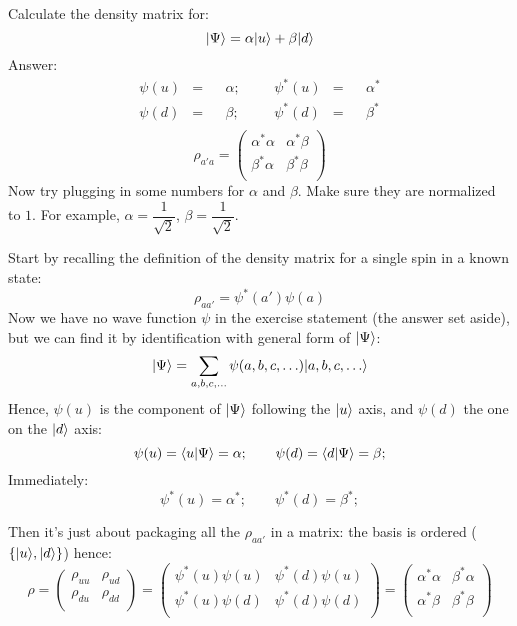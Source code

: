 \documentclass[solutions.tex]{subfiles}
\begin{document}
\maketitle
\begin{exercise} Calculate the density matrix for:
\[
	|\Psi\rangle = \alpha|u\rangle + \beta|d\rangle
\]
Answer:
\begin{equation*}\begin{aligned}
	\psi(u) &=&& \alpha;&&& \psi^*(u) &=&& \alpha^* \\
	\psi(d) &=&& \beta;&&&  \psi^*(d) &=&& \beta^* \\
\end{aligned}\end{equation*}
\[
	\rho_{a'a} = \begin{pmatrix}
		\alpha^*\alpha & \alpha^*\beta \\
		\beta^*\alpha  & \beta^*\beta  \\
	\end{pmatrix}
\]
Now try plugging in some numbers for $\alpha$ and $\beta$. Make
sure they are normalized to $1$. For example, $\alpha=\dfrac1{\sqrt2}$,
$\beta=\dfrac1{\sqrt2}$.
\end{exercise}
Start by recalling the definition of the density matrix for a single spin
in a known state:
\[
	\rho_{aa'} = \psi^*(a')\psi(a)
\]
Now we have no wave function $\psi$ in the exercise statement (the answer
set aside), but we can find it by identification with general form of
$|\Psi\rangle$:
\[
	|\Psi\rangle = \sum_{a,b,c,\ldots}\psi(a,b,c,\ldots)|a,b,c,\ldots\rangle
\]
Hence, $\psi(u)$ is the component of $|\Psi\rangle$ following the $|u\rangle$
axis, and $\psi(d)$ the one on the $|d\rangle$ axis:
\[
	\psi(u) = \left\langle u \middle| \Psi \right\rangle = \alpha;\qquad
	\psi(d) = \left\langle d \middle| \Psi \right\rangle = \beta;
\]
Immediately:
\[
	\psi^*(u) = \alpha^*;\qquad \psi^*(d) = \beta^*;
\]

Then it's just about packaging all the $\rho_{aa'}$ in a matrix: the
basis is ordered ($\{|u\rangle, |d\rangle\}$) hence:
\[
	\rho = \begin{pmatrix}
		\rho_{uu} & \rho_{ud} \\
		\rho_{du} & \rho_{dd} \\
	\end{pmatrix} = \begin{pmatrix}
		\psi^*(u)\psi(u) & \psi^*(d)\psi(u) \\
		\psi^*(u)\psi(d) & \psi^*(d)\psi(d) \\
	\end{pmatrix} = \boxed{\begin{pmatrix}
		\alpha^*\alpha & \beta^*\alpha \\
		\alpha^*\beta  & \beta^*\beta  \\
	\end{pmatrix}}
\]
\end{document}
